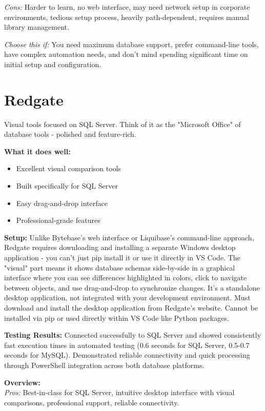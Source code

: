 \documentclass[11pt,a4paper]{article}
\begin{document}
\textit{Cons:} Harder to learn, no web interface, may need network setup in corporate environments, tedious setup process, heavily path-dependent, requires manual library management.

\textit{Choose this if:} You need maximum database support, prefer command-line tools, have complex automation needs, and don't mind spending significant time on initial setup and configuration.

\section{Redgate}

Visual tools focused on SQL Server. Think of it as the "Microsoft Office" of database tools - polished and feature-rich.

\textbf{What it does well:}
\begin{itemize}
    \item Excellent visual comparison tools
    \item Built specifically for SQL Server
    \item Easy drag-and-drop interface
    \item Professional-grade features
\end{itemize}

\textbf{Setup:} Unlike Bytebase's web interface or Liquibase's command-line approach, Redgate requires downloading and installing a separate Windows desktop application - you can't just pip install it or use it directly in VS Code. The "visual" part means it shows database schemas side-by-side in a graphical interface where you can see differences highlighted in colors, click to navigate between objects, and use drag-and-drop to synchronize changes. It's a standalone desktop application, not integrated with your development environment. Must download and install the desktop application from Redgate's website. Cannot be installed via pip or used directly within VS Code like Python packages.

\textbf{Testing Results:} Connected successfully to SQL Server and showed consistently fast execution times in automated testing (0.6 seconds for SQL Server, 0.5-0.7 seconds for MySQL). Demonstrated reliable connectivity and quick processing through PowerShell integration across both database platforms.

\textbf{Overview:}\\
\textit{Pros:} Best-in-class for SQL Server, intuitive desktop interface with visual comparisons, professional support, reliable connectivity.
\end{document}
